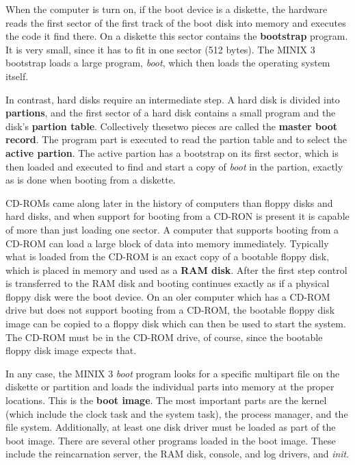 \documentclass{book}
\newcommand {\kw}  [1] {\textbf{#1}}
\newcommand {\sys} [1] {\textsl{#1}}
\begin{document}
When the computer is turn on, if the boot device is a diskette, 
the hardware reads the first sector of the first track of the boot disk into memory and executes the code it find there.
On a diskette this sector contains the \kw{bootstrap} program.
It is very small, since it has to fit in one sector (512 bytes).
The MINIX 3 bootstrap loads a large program, \sys{boot}, which then loads the operating system itself.

In contrast, hard disks require an intermediate step.
A hard disk is divided into \kw{partions}, and the first sector of a hard disk contains a small program and the disk's \kw{partion table}.
Collectively thesetwo pieces are called the \kw{master boot record}.
The program part is executed to read the partion table and to select the \kw{active partion}.
The active partion has a bootstrap on its first sector, which is then loaded and executed to find and start a copy of \sys{boot} in the partion,
exactly as is done when booting from a diskette.

CD-ROMs came along later in the history of computers than floppy disks and hard disks,
and when support for booting from a CD-RON is present it is capable of more than just loading one sector.
A computer that supports booting from a CD-ROM can load a large block of data into memory immediately.
Typically what is loaded from the CD-ROM is an exact copy of a bootable floppy disk, 
which is placed in memory and used as a \kw{RAM disk}.
After the first step control is transferred to the RAM disk and booting continues exactly as if a physical floppy disk were the boot device.
On an oler computer which has a CD-ROM drive but does not support booting from a CD-ROM, 
the bootable floppy disk image can be copied to a floppy disk which can then be used to start the system.
The CD-ROM must be in the CD-ROM drive, of course, since the bootable floppy disk image expects that.

In any case, the MINIX 3 \sys{boot} program looks for a specific multipart file on the diskette or partition 
and loads the individual parts into memory at the proper locations.
This is the \kw{boot image}.
The most important parts are the kernel (which include the clock task and the system task),
the process manager, and the file system.
Additionally, at least one disk driver must be loaded as part of the boot image.
There are several other programs loaded in the boot image.
These include the reincarnation server, the RAM disk, console, and log drivers, and \sys{init}.
\end{document}
